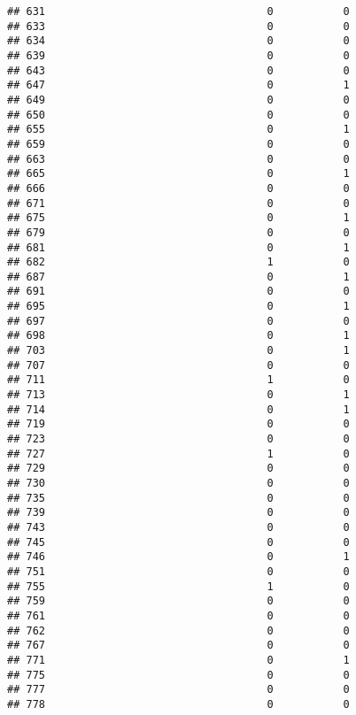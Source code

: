 \documentclass[
]{article}
\begin{document}
\begin{verbatim}
## 631                                   0           0
## 633                                   0           0
## 634                                   0           0
## 639                                   0           0
## 643                                   0           0
## 647                                   0           1
## 649                                   0           0
## 650                                   0           0
## 655                                   0           1
## 659                                   0           0
## 663                                   0           0
## 665                                   0           1
## 666                                   0           0
## 671                                   0           0
## 675                                   0           1
## 679                                   0           0
## 681                                   0           1
## 682                                   1           0
## 687                                   0           1
## 691                                   0           0
## 695                                   0           1
## 697                                   0           0
## 698                                   0           1
## 703                                   0           1
## 707                                   0           0
## 711                                   1           0
## 713                                   0           1
## 714                                   0           1
## 719                                   0           0
## 723                                   0           0
## 727                                   1           0
## 729                                   0           0
## 730                                   0           0
## 735                                   0           0
## 739                                   0           0
## 743                                   0           0
## 745                                   0           0
## 746                                   0           1
## 751                                   0           0
## 755                                   1           0
## 759                                   0           0
## 761                                   0           0
## 762                                   0           0
## 767                                   0           0
## 771                                   0           1
## 775                                   0           0
## 777                                   0           0
## 778                                   0           0

\end{verbatim}
\end{document}
